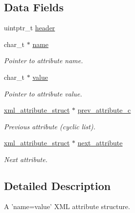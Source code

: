 \subsection*{Data Fields}
\begin{CompactItemize}
\item 
uintptr\_\-t \hyperlink{structpugi_1_1xml__attribute__struct_0dca6ca6c129bbf87a7ebaf87f3e12de}{header}
\item 
char\_\-t $\ast$ \hyperlink{structpugi_1_1xml__attribute__struct_a886c4aae23a132e1704717721ee2c19}{name}
\begin{CompactList}\small\item\em Pointer to attribute name. \item\end{CompactList}\item 
char\_\-t $\ast$ \hyperlink{structpugi_1_1xml__attribute__struct_e652627d56cb9dcc0afdd1fbf6570364}{value}
\begin{CompactList}\small\item\em Pointer to attribute value. \item\end{CompactList}\item 
\hyperlink{structpugi_1_1xml__attribute__struct}{xml\_\-attribute\_\-struct} $\ast$ \hyperlink{structpugi_1_1xml__attribute__struct_0e3a022235b316e4cfc1034ceb7d7862}{prev\_\-attribute\_\-c}
\begin{CompactList}\small\item\em Previous attribute (cyclic list). \item\end{CompactList}\item 
\hyperlink{structpugi_1_1xml__attribute__struct}{xml\_\-attribute\_\-struct} $\ast$ \hyperlink{structpugi_1_1xml__attribute__struct_9860c0eb7fa72dc9b69ee9b0575f9efc}{next\_\-attribute}
\begin{CompactList}\small\item\em Next attribute. \item\end{CompactList}\end{CompactItemize}


\subsection{Detailed Description}
A 'name=value' XML attribute structure. 



